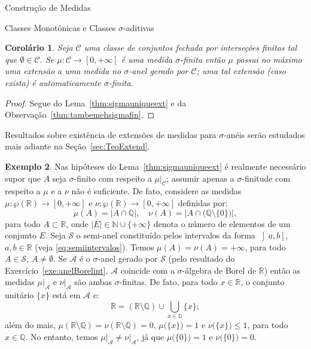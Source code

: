 \documentclass[oneside,final,11pt]{amsbook}
\newcommand{\R}{\mathds R}
\newcommand{\N}{\mathds N}
\newcommand{\Q}{\mathds Q}
\theoremstyle{remark}\newtheorem{exercise}{Exercício}[chapter]
\theoremstyle{remark}\newtheorem{*exercise}[exercise]{\hbox to 0pt{\hskip 0pt minus 1fil*}Exercício}
\theoremstyle{definition}\newtheorem{exdefin}{Definição}[chapter]
\theoremstyle{plain}\newtheorem{teo}{Teorema}[section]
\theoremstyle{plain}\newtheorem{lem}[teo]{Lema}
\theoremstyle{plain}\newtheorem{prop}[teo]{Proposição}
\theoremstyle{plain}\newtheorem{cor}[teo]{Corolário}
\theoremstyle{definition}\newtheorem{defin}[teo]{Definição}
\theoremstyle{remark}\newtheorem{rem}[teo]{Observação}
\theoremstyle{definition}\newtheorem{notation}[teo]{Notação}
\theoremstyle{definition}\newtheorem{convention}[teo]{Convenção}
\theoremstyle{definition}\newtheorem{example}[teo]{Exemplo}
\numberwithin{section}{chapter}
\numberwithin{equation}{section}
\begin{document}
\begin{chapter}{Construção de Medidas}
\begin{section}{Classes Monotônicas e Classes ${\sigma}$-aditivas}
\begin{cor}\label{thm:coruniquext}
Seja $\mathcal C$ uma classe de conjuntos fechada por interseções finitas tal que $\emptyset\in\mathcal C$.
Se $\mu:\mathcal C\to[0,+\infty]$ é uma medida $\sigma$-finita então $\mu$ possui no máximo
uma extensão a uma medida no $\sigma$-anel gerado por $\mathcal C$; uma tal extensão (caso
exista) é automaticamente $\sigma$-finita.
\end{cor}
\begin{proof}
Segue do Lema~\ref{thm:sigmauniqueext} e da Observação~\ref{thm:tambemehsigmafin}.
\end{proof}
Resultados sobre existência de extensões de medidas para $\sigma$-anéis serão estudados
mais adiante na Seção~\ref{sec:TeoExtend}.

\begin{example}\label{exa:naobastanocalA}
Nas hipóteses do Lema~\ref{thm:sigmauniqueext} é realmente necessário supor que
$A$ seja $\sigma$-finito com respeito a $\mu\vert_{\mathcal C}$; assumir apenas
a $\sigma$-finitude com respeito a $\mu$ e a $\nu$ não é suficiente.
De fato, considere as medidas $\mu:\wp(\R)\to[0,+\infty]$ e
$\nu:\wp(\R)\to[0,+\infty]$ definidas por:
\[\mu(A)=\vert A\cap\Q\vert,\quad\nu(A)=\big\vert A\cap\big(\Q\setminus\{0\}\big)\big\vert,\]
para todo $A\subset\R$, onde $\vert E\vert\in\N\cup\{+\infty\}$ denota o número de elementos
de um conjunto $E$. Seja $\mathcal S$ o semi-anel constituído pelos intervalos da forma
$\left]a,b\right]$, $a,b\in\R$ (veja \eqref{eq:semiintervalos}). Temos $\mu(A)=\nu(A)=+\infty$,
para todo $A\in\mathcal S$, $A\ne\emptyset$. Se $\mathcal A$ é o $\sigma$-anel
gerado por $\mathcal S$ (pelo resultado do Exercício~\ref{exe:anelBorelint},
$\mathcal A$ coincide com a $\sigma$-álgebra de Borel de $\R$) então as medidas $\mu\vert_{\mathcal A}$
e $\nu\vert_{\mathcal A}$ são ambas $\sigma$-finitas. De fato, para todo $x\in\R$,
o conjunto unitário $\{x\}$ está em $\mathcal A$ e:
\[\R=(\R\setminus\Q)\cup\bigcup_{x\in\Q}\{x\};\]
além do mais, $\mu(\R\setminus\Q)=\nu(\R\setminus\Q)=0$, $\mu\big(\{x\}\big)=1$
e $\nu\big(\{x\}\big)\le1$, para todo $x\in\Q$. No entanto, temos
$\mu\vert_{\mathcal A}\ne\nu\vert_{\mathcal A}$, já que $\mu\big(\{0\}\big)=1$
e $\nu\big(\{0\}\big)=0$.
\end{example}


\end{section}
\end{chapter}
\end{document}
